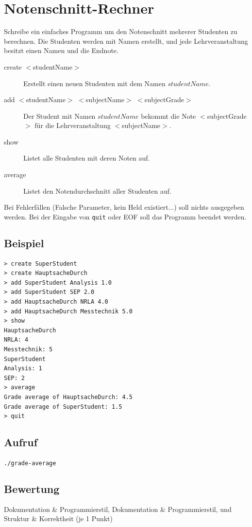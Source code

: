 \documentclass[a4paper,10pt]{article}
\begin{document}
\section*{Notenschnitt-Rechner}

Schreibe ein einfaches Programm um den Notenschnitt mehrerer Studenten zu berechnen. Die Studenten werden mit Namen erstellt, und jede Lehrveranstaltung besitzt einen Namen und die Endnote.


\begin{description}
 \item[create $<$studentName$>$] Erstellt einen neuen Studenten mit dem Namen $studentName$. 
 \item[add $<$studentName$>$ $<$subjectName$>$ $<$subjectGrade$>$] Der Student mit Namen $studentName$ bekommt die Note $<$subjectGrade$>$ für die Lehrveranstaltung $<$subjectName$>$.
 \item[show] Listet alle Studenten mit deren Noten auf. 
 \item[average] Listet den Notendurchschnitt aller Studenten auf.
\end{description}
Bei Fehlerfällen (Falsche Parameter, kein Held existiert...) soll nichts ausgegeben werden.
Bei der Eingabe von \texttt{quit} oder EOF soll das Programm beendet werden.

\subsection*{Beispiel}
\begin{verbatim}
> create SuperStudent
> create HauptsacheDurch
> add SuperStudent Analysis 1.0
> add SuperStudent SEP 2.0
> add HauptsacheDurch NRLA 4.0
> add HauptsacheDurch Messtechnik 5.0
> show
HauptsacheDurch
NRLA: 4
Messtechnik: 5
SuperStudent
Analysis: 1
SEP: 2
> average
Grade average of HauptsacheDurch: 4.5
Grade average of SuperStudent: 1.5
> quit
\end{verbatim}

\subsection*{Aufruf}
\texttt{./grade-average}

\subsection*{Bewertung}
Dokumentation \& Programmierstil,  Dokumentation \& Programmierstil, und Struktur \& Korrektheit (je 1 Punkt)
\newpage
\end{document}
